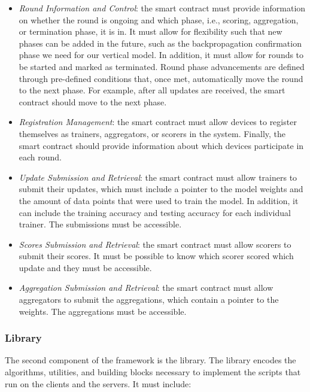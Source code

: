 \begin{itemize}
    \item \textit{Round Information and Control}: the smart contract must provide information on whether the round is ongoing and which phase, i.e., scoring, aggregation, or termination phase, it is in. It must allow for flexibility such that new phases can be added in the future, such as the backpropagation confirmation phase we need for our vertical model. In addition, it must allow for rounds to be started and marked as terminated. Round phase advancements are defined through pre-defined conditions that, once met, automatically move the round to the next phase. For example, after all updates are received, the smart contract should move to the next phase.
    
    \item \textit{Registration Management}: the smart contract must allow devices to register themselves as trainers, aggregators, or scorers in the system. Finally, the smart contract should provide information about which devices participate in each round.
    
    \item \textit{Update Submission and Retrieval}: the smart contract must allow trainers to submit their updates, which must include a pointer to the model weights and the amount of data points that were used to train the model. In addition, it can include the training accuracy and testing accuracy for each individual trainer. The submissions must be accessible.
    
    \item \textit{Scores Submission and Retrieval}: the smart contract must allow scorers to submit their scores. It must be possible to know which scorer scored which update and they must be accessible.
    
    \item \textit{Aggregation Submission and Retrieval}: the smart contract must allow aggregators to submit the aggregations, which contain a pointer to the weights. The aggregations must be accessible.
\end{itemize}

\subsubsection{Library}\label{meth:library}

The second component of the framework is the library. The library encodes the algorithms, utilities, and building blocks necessary to implement the scripts that run on the clients and the servers. It must include:

